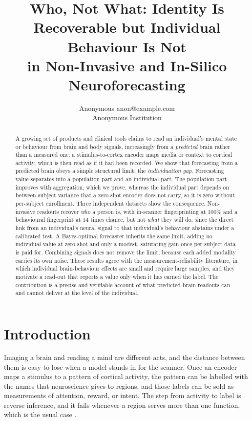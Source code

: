 \documentclass{article}
\title{Who, Not What: Identity Is Recoverable but Individual Behaviour Is Not\\
in Non-Invasive and In-Silico Neuroforecasting}
\author{\name Anonymous \email anon@example.com \\
\addr Anonymous Institution}
\begin{document}
\maketitle

\begin{abstract}
A growing set of products and clinical tools claims to read an individual's mental state or behaviour
from brain and body signals, increasingly from a \emph{predicted} brain rather than a measured one: a
stimulus-to-cortex encoder maps media or context to cortical activity, which is then read as if it had
been recorded. We show that forecasting from a predicted brain obeys a simple structural limit, the
\emph{individuation gap}. Forecasting value separates into a population part and an individual part. The
population part improves with aggregation, which we prove, whereas the individual part depends on
between-subject variance that a zero-shot encoder does not carry, so it is zero without per-subject
enrollment. Three independent datasets show the consequence. Non-invasive readouts recover \emph{who} a
person is, with in-scanner fingerprinting at 100\% and a behavioural fingerprint at 14 times chance, but
not \emph{what} they will do, since the direct link from an individual's neural signal to that
individual's behaviour abstains under a calibrated test. A Bayes-optimal forecaster inherits the same
limit, adding no individual value at zero-shot and only a modest, saturating gain once per-subject data is
paid for. Combining signals does not remove the limit, because each added modality carries its own noise.
These results agree with the measurement-reliability literature, in which individual brain-behaviour
effects are small and require large samples, and they motivate a read-out that reports a value only when
it has earned the label. The contribution is a precise and verifiable account of what predicted-brain
readouts can and cannot deliver at the level of the individual.
\end{abstract}

\section{Introduction}
Imaging a brain and reading a mind are different acts, and the distance between them is easy to lose when a
model stands in for the scanner. Once an encoder maps a stimulus to a pattern of cortical activity, the
pattern can be labelled with the names that neuroscience gives to regions, and those labels can be sold as
measurements of attention, reward, or intent. The step from activity to label is reverse inference, and it
fails whenever a region serves more than one function, which is the usual case
\citep{poldrack2006,hutzler2013}.
\end{document}
